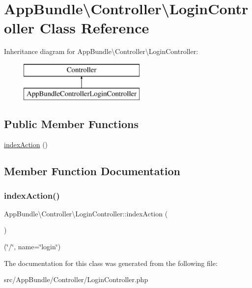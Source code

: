 \hypertarget{class_app_bundle_1_1_controller_1_1_login_controller}{}\section{App\+Bundle\textbackslash{}Controller\textbackslash{}Login\+Controller Class Reference}
\label{class_app_bundle_1_1_controller_1_1_login_controller}
Inheritance diagram for App\+Bundle\textbackslash{}Controller\textbackslash{}Login\+Controller\+:\begin{figure}[H]
\begin{center}
\leavevmode
\includegraphics[height=2.000000cm]{class_app_bundle_1_1_controller_1_1_login_controller}
\end{center}
\end{figure}
\subsection*{Public Member Functions}
\begin{DoxyCompactItemize}
\item 
\mbox{\hyperlink{class_app_bundle_1_1_controller_1_1_login_controller_a263f12317c12ef52590611074ddae532}{index\+Action}} ()
\end{DoxyCompactItemize}


\subsection{Member Function Documentation}
\mbox{\label{class_app_bundle_1_1_controller_1_1_login_controller_a263f12317c12ef52590611074ddae532}} 
\subsubsection{\texorpdfstring{index\+Action()}{indexAction()}}
{\footnotesize\ttfamily App\+Bundle\textbackslash{}\+Controller\textbackslash{}\+Login\+Controller\+::index\+Action (\begin{DoxyParamCaption}{ }\end{DoxyParamCaption})}

(\char`\"{}/\char`\"{}, name=\char`\"{}login\char`\"{}) 

The documentation for this class was generated from the following file\+:\begin{DoxyCompactItemize}
\item 
src/\+App\+Bundle/\+Controller/Login\+Controller.\+php\end{DoxyCompactItemize}
